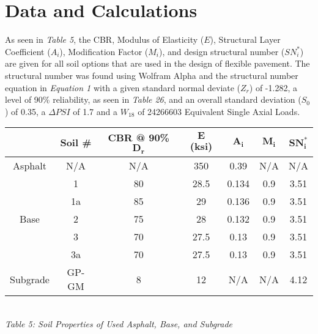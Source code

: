 \documentclass{article}
\begin{document}
\section{Data and Calculations}
\begin{spacing}{1.6}
\par As seen in \emph{Table 5}, the CBR, Modulus of Elasticity ($E$), Structural Layer Coefficient ($A_i$), Modification Factor ($M_i$), and design structural number ($SN_i^*$) are given for all soil options that are used in the design of flexible pavement. The structural number was found using Wolfram Alpha and the structural number equation in \emph{Equation 1} with a given standard normal deviate ($Z_r$) of -1.282, a level of 90\% reliability, as seen in \emph{Table 26}, and an overall standard deviation ($S_0$) of 0.35, a $\Delta PSI$ of 1.7 and a $W_{18}$ of 24266603 Equivalent Single Axial Loads. 
\begin{center}
    \vspace{2mm}
\begin{spacing}{1.6}
    \begin{tabular}{|c|c|ccccc|}
        \hline
        & \textbf{Soil \#} & \textbf{CBR @ 90\% $\bm{D_r}$} & $\bm{E}$ \textbf{(ksi)} & $\bm{A_i}$ & $\bm{M_i}$ & $\bm{SN_i^*}$  \\\hline
        Asphalt               & N/A   & N/A & 350  & 0.39  & N/A & N/A   \\
        \multirow{5}{*}{Base} & 1     & 80  & 28.5 & 0.134 & 0.9 & 3.51  \\
                            & 1a    & 85  & 29   & 0.136 & 0.9 & 3.51  \\
                            & 2     & 75  & 28   & 0.132 & 0.9 & 3.51  \\
                            & 3     & 70  & 27.5 & 0.13  & 0.9 & 3.51  \\
                            & 3a    & 70  & 27.5 & 0.13  & 0.9 & 3.51  \\
        Subgrade              & GP-GM & 8   & 12   & N/A   & N/A & 4.12\\\hline
    \end{tabular}
    \vspace{3mm}
    \emph{\\Table 5: Soil Properties of Used Asphalt, Base, and Subgrade\\}
\end{spacing}
\vspace{-1mm}

\end{center}
\end{spacing}
\end{document}
